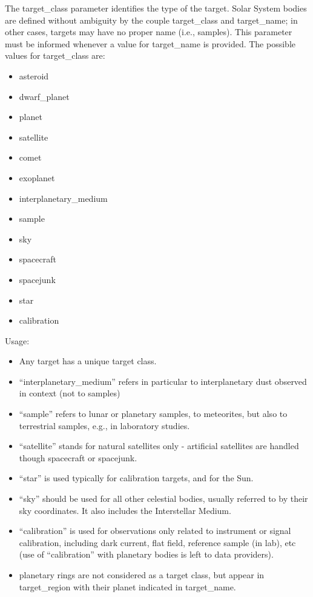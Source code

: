 \documentclass[11pt,a4paper]{ivoa}
\begin{document}
The target\_class parameter identifies the type of the target. Solar System bodies are defined without ambiguity by the couple target\_class and target\_name; in other cases, targets may have no proper name (i.e., samples).  This parameter must be informed whenever a value for target\_name is provided. The possible values for target\_class are:

\begin{itemize}
\item asteroid
\item dwarf\_planet
\item planet
\item satellite
\item comet
\item exoplanet
\item interplanetary\_medium
\item sample
\item sky
\item spacecraft
\item spacejunk
\item star
\item calibration
\end{itemize}

Usage:

\begin{itemize}
\item Any target has a unique target class.
\item ``interplanetary\_medium'' refers in particular to interplanetary dust observed in context (not to samples)
\item ``sample'' refers to lunar or planetary samples, to meteorites, but also to terrestrial samples, e.g., in laboratory studies.
\item ``satellite'' stands for natural satellites only - artificial satellites are handled though spacecraft or spacejunk.
\item ``star'' is used typically for calibration targets, and for the Sun.
\item ``sky'' should be used for all other celestial bodies, usually referred to by their sky coordinates. It also includes the Interstellar Medium.
\item ``calibration'' is used for observations only related to instrument or signal calibration, including dark current, flat field, reference sample (in lab), etc (use of ``calibration'' with planetary bodies is left to data providers).
\item planetary rings are not considered as a target class, but appear in target\_region with their planet indicated in target\_name.
\end{itemize}
\end{document}
